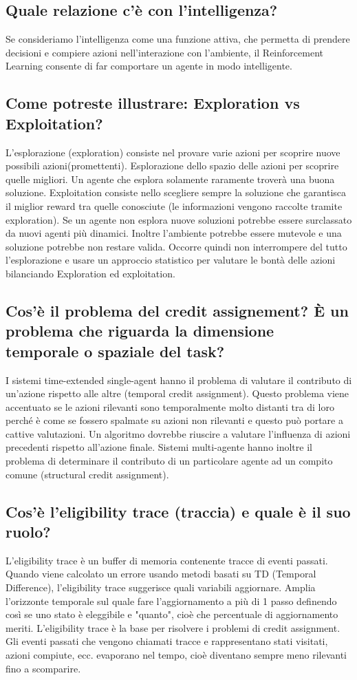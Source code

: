 \documentclass[\main/main.tex]{subfiles}
\begin{document}
\subsection{Quale relazione c'è con l'intelligenza?}
Se consideriamo l'intelligenza come una funzione attiva, che permetta di prendere decisioni e compiere azioni nell'interazione con l'ambiente, il Reinforcement Learning consente di far comportare un agente in modo intelligente.

\subsection{Come potreste illustrare: Exploration vs Exploitation?}
L'esplorazione (exploration) consiste nel provare varie azioni per scoprire nuove possibili azioni(promettenti). Esplorazione dello spazio delle azioni per scoprire quelle migliori.
Un agente che esplora solamente raramente troverà una buona soluzione.
Exploitation consiste nello scegliere sempre la soluzione che garantisca il miglior reward tra quelle conosciute (le informazioni vengono raccolte tramite exploration).
Se un agente non esplora nuove soluzioni potrebbe essere surclassato da nuovi agenti più dinamici. Inoltre l'ambiente potrebbe essere mutevole e una soluzione potrebbe non restare valida. Occorre quindi non interrompere del tutto l'esplorazione e usare un approccio statistico per valutare le bontà delle azioni bilanciando Exploration ed exploitation.

\subsection{Cos'è il problema del credit assignement? È un problema che riguarda la dimensione temporale o spaziale del task?}
I sistemi time-extended single-agent hanno il problema di valutare il contributo di un'azione rispetto alle altre (temporal credit assignment).
Questo problema viene accentuato se le azioni rilevanti sono temporalmente molto distanti tra di loro perché è come se fossero spalmate su azioni non rilevanti e questo può portare a cattive valutazioni. Un algoritmo dovrebbe riuscire a valutare l'influenza di azioni precedenti rispetto all'azione finale.
Sistemi multi-agente hanno inoltre il problema di determinare il contributo di un particolare agente ad un compito comune (structural credit assignment).

\subsection{Cos'è l'eligibility trace (traccia) e quale è il suo ruolo?}
L'eligibility trace è un buffer di memoria contenente tracce di eventi passati.
Quando viene calcolato un errore usando metodi basati su TD (Temporal Difference), l'eligibility trace suggerisce quali variabili aggiornare.
Amplia l'orizzonte temporale sul quale fare l'aggiornamento a più di 1 passo definendo così se uno stato è eleggibile e "quanto", cioè che percentuale di aggiornamento meriti.
L'eligibility trace è la base per risolvere i problemi di credit assignment.
Gli eventi passati che vengono chiamati tracce e rappresentano stati visitati, azioni compiute, ecc. evaporano nel tempo, cioè diventano sempre meno rilevanti fino a scomparire.
\end{document}
